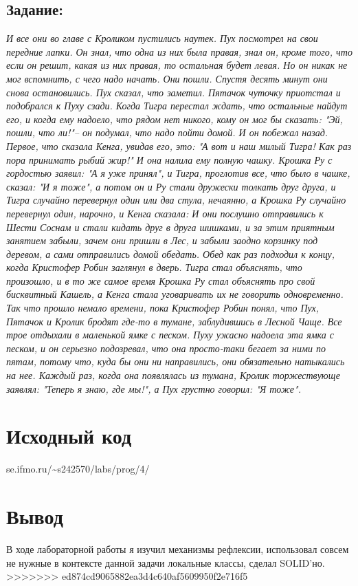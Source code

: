 \documentclass[11pt]{article}
\begin{document}
\subsection{Задание:}
\label{sec:orgffd1f8d}
\emph{И все они во главе с Кроликом пустились наутек. Пух посмотрел на свои передние лапки. Он знал, что одна из них была правая, знал он, кроме того, что если он решит, какая из них правая, то остальная будет левая. Но он никак не мог вспомнить, с чего надо начать. Они пошли. Спустя десять минут они снова остановились. Пух сказал, что заметил. Пятачок чуточку приотстал и подобрался к Пуху сзади. Когда Тигра перестал ждать, что остальные найдут его, и когда ему надоело, что рядом нет никого, кому он мог бы сказать: "Эй, пошли, что ли!"-- он подумал, что надо пойти домой. И он побежал назад. Первое, что сказала Кенга, увидав его, это: "А вот и наш милый Тигра! Как раз пора принимать рыбий жир!" И она налила ему полную чашку. Крошка Ру с гордостью заявил: "А я уже принял", и Тигра, проглотив все, что было в чашке, сказал: "И я тоже", а потом он и Ру стали дружески толкать друг друга, и Тигра случайно перевернул один или два стула, нечаянно, а Крошка Ру случайно перевернул один, нарочно, и Кенга сказала: И они послушно отправились к Шести Соснам и стали кидать друг в друга шишками, и за этим приятным занятием забыли, зачем они пришли в Лес, и забыли заодно корзинку под деревом, а сами отправились домой обедать. Обед как раз подходил к концу, когда Кристофер Робин заглянул в дверь. Тигра стал объяснять, что произошло, и в то же самое время Крошка Ру стал объяснять про свой бисквитный Кашель, а Кенга стала уговаривать их не говорить одновременно. Так что прошло немало времени, пока Кристофер Робин понял, что Пух, Пятачок и Кролик бродят где-то в тумане, заблудившись в Лесной Чаще. Все трое отдыхали в маленькой ямке с песком. Пуху ужасно надоела эта ямка с песком, и он серьезно подозревал, что она просто-таки бегает за ними по пятам, потому что, куда бы они ни направились, они обязательно натыкались на нее. Каждый раз, когда она появлялась из тумана, Кролик торжествующе заявлял: "Теперь я знаю, где мы!", а Пух грустно говорил: "Я тоже".}

\section{Исходный код}
\label{sec:orge77b9ca}
se.ifmo.ru/\textasciitilde{}s242570/labs/prog/4/

\section{Вывод}
\label{sec:org321da9a}
В ходе лабораторной работы я изучил механизмы рефлексии, использовал совсем не нужные в контексте данной задачи локальные классы, сделал SOLID'но.
>>>>>>> ed874cd9065882ea3d4c640af5609950f2e716f5
\end{document}
